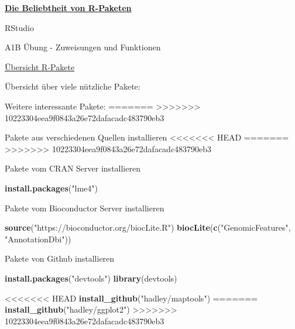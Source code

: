 \documentclass[ignorenonframetext,]{beamer}
\newenvironment{Shaded}{\begin{snugshade}}{\end{snugshade}}
\newcommand{\KeywordTok}[1]{\textcolor[rgb]{0.13,0.29,0.53}{\textbf{#1}}}
\newcommand{\StringTok}[1]{\textcolor[rgb]{0.31,0.60,0.02}{#1}}
\newcommand{\NormalTok}[1]{#1}
\newcommand{\KeywordTok}[1]{\textcolor[rgb]{0.13,0.29,0.53}{\textbf{#1}}}
\newcommand{\NormalTok}[1]{#1}
\newcommand{\StringTok}[1]{\textcolor[rgb]{0.31,0.60,0.02}{#1}}
\begin{document}
\begin{frame}{\href{https://gallery.shinyapps.io/cran-gauge/}{\textbf{Die
Beliebtheit von R-Paketen}}}
\begin{frame}{RStudio}
\begin{frame}[fragile]{A1B Übung - Zuweisungen und Funktionen}
\begin{frame}{\href{https://www.youtube.com/watch?v=kKI9--Opmso}{Übersicht
R-Pakete}}
\begin{frame}[fragile]{Übersicht über viele nützliche Pakete:}
\begin{block}{Weitere interessante Pakete:}
=======
>>>>>>> 10223304eea9f0843a26e72dafacadc483790eb3
\end{block}

\end{frame}

\begin{frame}[fragile]{Pakete aus verschiedenen Quellen installieren}
<<<<<<< HEAD
=======
\protect\hypertarget{pakete-aus-verschiedenen-quellen-installieren}{}
>>>>>>> 10223304eea9f0843a26e72dafacadc483790eb3

\begin{block}{Pakete vom CRAN Server installieren}

\begin{Shaded}
\begin{Highlighting}[]
\KeywordTok{install.packages}\NormalTok{(}\StringTok{"lme4"}\NormalTok{)}
\end{Highlighting}
\end{Shaded}

\end{block}

\begin{block}{Pakete vom Bioconductor Server installieren}

\begin{Shaded}
\begin{Highlighting}[]
\KeywordTok{source}\NormalTok{(}\StringTok{"https://bioconductor.org/biocLite.R"}\NormalTok{)}
\KeywordTok{biocLite}\NormalTok{(}\KeywordTok{c}\NormalTok{(}\StringTok{"GenomicFeatures"}\NormalTok{, }\StringTok{"AnnotationDbi"}\NormalTok{))}
\end{Highlighting}
\end{Shaded}

\end{block}

\begin{block}{Pakete von Github installieren}

\begin{Shaded}
\begin{Highlighting}[]
\KeywordTok{install.packages}\NormalTok{(}\StringTok{"devtools"}\NormalTok{)}
\KeywordTok{library}\NormalTok{(devtools)}

<<<<<<< HEAD
\KeywordTok{install_github}\NormalTok{(}\StringTok{"hadley/maptools"}\NormalTok{)}
=======
\KeywordTok{install_github}\NormalTok{(}\StringTok{"hadley/ggplot2"}\NormalTok{)}
>>>>>>> 10223304eea9f0843a26e72dafacadc483790eb3
\end{Highlighting}
\end{Shaded}


\end{block}
\end{frame}
\end{frame}
\end{frame}
\end{frame}
\end{frame}
\end{document}
